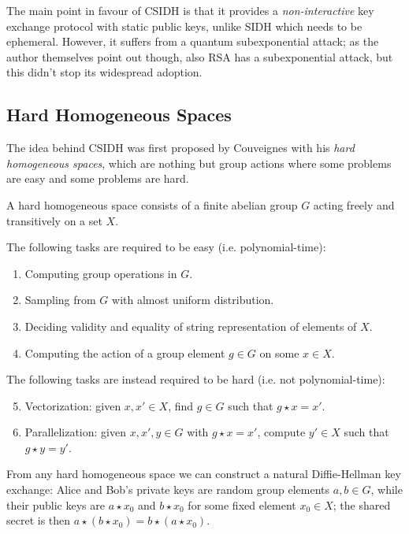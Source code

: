 The main point in favour of CSIDH is that it provides a \emph{non-interactive} key exchange protocol with static public keys, unlike SIDH which needs to be ephemeral. However, it suffers from a quantum subexponential attack; as the author themselves point out though, also RSA has a subexponential attack, but this didn't stop its widespread adoption.

\subsection{Hard Homogeneous Spaces}
The idea behind CSIDH was first proposed by Couveignes \cite{Couveignes} with his \emph{hard homogeneous spaces}, which are nothing but group actions where some problems are easy and some problems are hard.

\begin{definition}
    A hard homogeneous space consists of a finite abelian group $G$ acting freely and transitively on a set $X$.
    
    The following tasks are required to be easy (i.e. polynomial-time):
    \begin{enumerate}
        \item Computing group operations in $G$.
        \item Sampling from $G$ with almost uniform distribution.
        \item Deciding validity and equality of string representation of elements of $X$.
        \item Computing the action of a group element $g\in G$ on some $x\in X$.
    \end{enumerate}

    The following tasks are instead required to be hard (i.e. not polynomial-time):
    \begin{enumerate}
        \setcounter{enumi}{4}
        \item Vectorization: given $x,x'\in X$, find $g\in G$ such that $g\star x=x'$.
        \item Parallelization: given $x,x',y\in G$ with $g\star x=x'$, compute $y'\in X$ such that $g\star y=y'$.
    \end{enumerate}
\end{definition}

From any hard homogeneous space we can construct a natural Diffie-Hellman key exchange: Alice and Bob's private keys are random group elements $a,b\in G$, while their public keys are $a\star x_0$ and $b\star x_0$ for some fixed element $x_0\in X$; the shared secret is then $a\star(b\star x_0)=b\star(a\star x_0)$.

